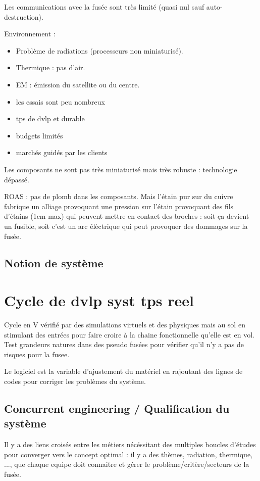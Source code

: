 \documentclass[a4paper,12pt]{article}
\begin{document}
Les communications avec la fusée sont très limité (quasi nul sauf auto-destruction).

Environnement : 
\begin{itemize} 
\item Problème de radiations (processeurs non miniaturisé).
\item Thermique : pas d'air.
\item EM : émission du satellite ou du centre. 
\item les essais sont peu nombreux
\item tps de dvlp et durable
\item budgets limités
\item marchés guidés par les clients
\end{itemize}
Les composants ne sont pas très miniaturisé mais très robuste : technologie dépassé.


ROAS : pas de plomb dans les composants. Mais l'étain pur sur du cuivre fabrique un alliage provoquant une pression sur l'étain provoquant des fils d'étains (1cm max) qui peuvent mettre en contact des broches : soit ça devient un fusible, soit c'est un arc élèctrique qui peut provoquer des dommages sur la fusée.

\subsection{Notion de système}

\section{Cycle de dvlp syst tps reel}

Cycle en V vérifié par des simulations virtuels et des physiques mais au sol en stimulant des entrées pour faire croire à la chaine fonctionnelle qu'elle est en vol.
Test grandeurs natures dans des pseudo fusées pour vérifier qu'il n'y a pas de risques pour la fusee.

Le logiciel est la variable d'ajustement du matériel en rajoutant des lignes de codes pour corriger les problèmes du système.
\subsection{Concurrent engineering / Qualification du système}
Il y a des liens croisés entre les métiers nécéssitant des multiples boucles d'études pour converger vers le concept optimal : il y a des thèmes, radiation, thermique, ..., que chaque equipe doit connaitre et gérer le problème/critère/secteurs de la fusée.
\end{document}
